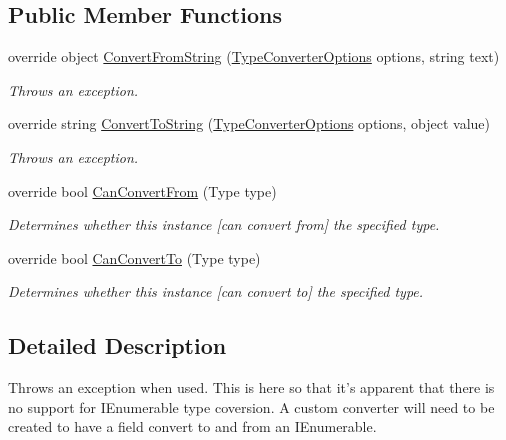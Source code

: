 \subsection*{Public Member Functions}
\begin{DoxyCompactItemize}
\item 
override object \hyperlink{a00078_a692617638507cd1033728d7f718fcd2a}{Convert\-From\-String} (\hyperlink{a00154}{Type\-Converter\-Options} options, string text)
\begin{DoxyCompactList}\small\item\em Throws an exception. \end{DoxyCompactList}\item 
override string \hyperlink{a00078_a7e07e9532857d748654d37db590a0e11}{Convert\-To\-String} (\hyperlink{a00154}{Type\-Converter\-Options} options, object value)
\begin{DoxyCompactList}\small\item\em Throws an exception. \end{DoxyCompactList}\item 
override bool \hyperlink{a00078_af66a7c67041f4c8061aa66e9e36359cf}{Can\-Convert\-From} (Type type)
\begin{DoxyCompactList}\small\item\em Determines whether this instance \mbox{[}can convert from\mbox{]} the specified type. \end{DoxyCompactList}\item 
override bool \hyperlink{a00078_a44d625b44f770b945a29cd89e399f90f}{Can\-Convert\-To} (Type type)
\begin{DoxyCompactList}\small\item\em Determines whether this instance \mbox{[}can convert to\mbox{]} the specified type. \end{DoxyCompactList}\end{DoxyCompactItemize}


\subsection{Detailed Description}
Throws an exception when used. This is here so that it's apparent that there is no support for I\-Enumerable type coversion. A custom converter will need to be created to have a field convert to and from an I\-Enumerable. 



